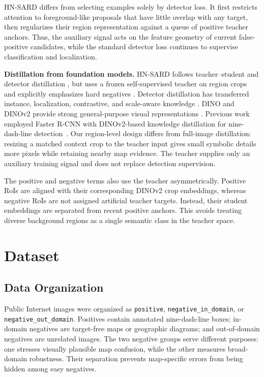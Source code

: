 \documentclass[conference,a4paper]{IEEEtran}
\begin{document}
HN-SARD differs from selecting examples solely by detector loss. It first restricts attention to foreground-like proposals that have little overlap with any target, then regularizes their region representation against a queue of positive teacher anchors. Thus, the auxiliary signal acts on the feature geometry of current false-positive candidates, while the standard detector loss continues to supervise classification and localization.

\textbf{Distillation from foundation models.}
HN-SARD follows teacher--student and detector distillation \cite{hinton2015distilling,li2022rank}, but uses a frozen self-supervised teacher on region crops and explicitly emphasizes hard negatives \cite{shrivastava2016ohem,cheng2018dcr}. Detector distillation has transferred instance, localization, contrastive, and scale-aware knowledge \cite{dai2021gid,zheng2022localization,yao2021gdetkd,zhu2023scalekd}. DINO and DINOv2 provide strong general-purpose visual representations \cite{caron2021dino,oquab2023dinov2}. Previous work employed Faster R-CNN with DINOv2-based knowledge distillation for nine-dash-line detection~\cite{tran2025detecting}. Our region-level design differs from full-image distillation: resizing a matched context crop to the teacher input gives small symbolic details more pixels while retaining nearby map evidence. The teacher supplies only an auxiliary training signal and does not replace detection supervision.

The positive and negative terms also use the teacher asymmetrically. Positive RoIs are aligned with their corresponding DINOv2 crop embeddings, whereas negative RoIs are not assigned artificial teacher targets. Instead, their student embeddings are separated from recent positive anchors. This avoids treating diverse background regions as a single semantic class in the teacher space.

\section{Dataset}
\subsection{Data Organization}
Public Internet images were organized as \texttt{positive}, \texttt{negative\_in\_domain}, or \texttt{negative\_out\_domain}. Positives contain annotated nine-dash-line boxes; in-domain negatives are target-free maps or geographic diagrams; and out-of-domain negatives are unrelated images. The two negative groups serve different purposes: one stresses visually plausible map confusion, while the other measures broad-domain robustness. Their separation prevents map-specific errors from being hidden among easy negatives.
\end{document}
